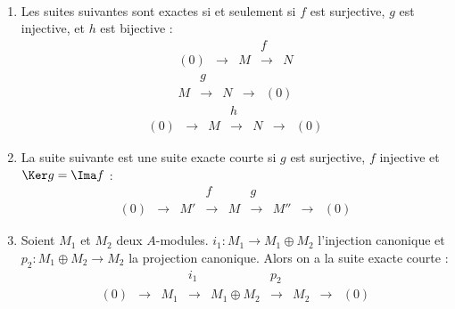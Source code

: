 \begin{example}[Exemples] \
 
 \begin{enumerate}
  \item Les suites suivantes sont exactes si et seulement si $f$ est surjective,
$g$ est injective, et $h$ est bijective :
  \vspace{-0.5em}\begin{displaymath}\begin{array}{ccccc}
    &               &   & f              &    \\
 (0)&\longrightarrow& M &\longrightarrow &N
 \end{array} \end{displaymath}
   \begin{displaymath}\begin{array}{ccccc}
    & g              &   &               &    \\
 M&\longrightarrow& N &\longrightarrow &(0)
 \end{array} \end{displaymath}
   \begin{displaymath}\begin{array}{ccccccc}
    &               &   & h              & &               & \\
 (0)&\longrightarrow& M &\longrightarrow &N&\longrightarrow&(0)
 \end{array} \end{displaymath} \vspace{0.5em}
 
  \item La suite suivante est une suite exacte courte si $g$ est surjective,
$f$ injective et $\Ker g = \Ima f$ : 
\vspace{-0.5em}\begin{displaymath}\begin{array}{ccccccccc}
    &               &   & f          &               & g &   & &\\
 (0)&\longrightarrow&M'&\longrightarrow& M &\longrightarrow
&M''& \longrightarrow &(0)
 \end{array} \end{displaymath} \vspace{0.5em}
 
  \item Soient $M_1$ et $M_2$ deux $A$-modules. $i_1 : M_1 \rightarrow
M_1\oplus M_2$ l'injection canonique et $p_2 : M_1\oplus M_2 \rightarrow M_2$
la projection canonique. Alors on a la suite exacte courte :
\vspace{-0.5em}\begin{displaymath}\begin{array}{ccccccccc}
    &               &   & i_1           &               & p_2                  
&   & &\\
 (0)&\longrightarrow&M_1&\longrightarrow& M_1\oplus M_2 &\longrightarrow
&M_2& \longrightarrow &(0)
 \end{array} \end{displaymath}
 \end{enumerate}
\end{example}

